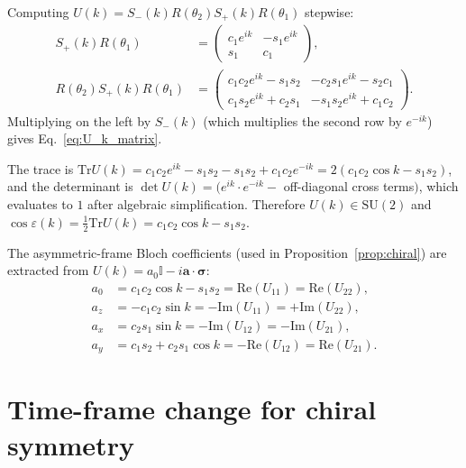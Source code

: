 \documentclass[aps,pra,reprint,amsmath,amssymb,superscriptaddress,nofootinbib,longbibliography]{revtex4-2}
\newcommand{\I}{\mathbb{I}}
\newcommand{\Tr}{\mathrm{Tr}}
\begin{document}
Computing $U(k) = S_-(k) R(\theta_2) S_+(k) R(\theta_1)$ stepwise:
\begin{align}
S_+(k) R(\theta_1) &= \begin{pmatrix} c_1 e^{ik} & -s_1 e^{ik} \\ s_1 & c_1 \end{pmatrix}, \\
R(\theta_2) S_+(k) R(\theta_1) &= \begin{pmatrix} c_1 c_2 e^{ik} - s_1 s_2 & -c_2 s_1 e^{ik} - s_2 c_1 \\ c_1 s_2 e^{ik} + c_2 s_1 & -s_1 s_2 e^{ik} + c_1 c_2 \end{pmatrix}.
\end{align}
Multiplying on the left by $S_-(k)$ (which multiplies the second row by $e^{-ik}$) gives Eq.~\eqref{eq:U_k_matrix}.

The trace is $\Tr U(k) = c_1 c_2 e^{ik} - s_1 s_2 - s_1 s_2 + c_1 c_2 e^{-ik} = 2(c_1 c_2 \cos k - s_1 s_2)$, and the determinant is $\det U(k) = (e^{ik} \cdot e^{-ik} - $ off-diagonal cross terms$)$, which evaluates to $1$ after algebraic simplification. Therefore $U(k) \in \mathrm{SU}(2)$ and $\cos\varepsilon(k) = \frac{1}{2}\Tr U(k) = c_1 c_2 \cos k - s_1 s_2$.

The asymmetric-frame Bloch coefficients (used in Proposition~\ref{prop:chiral}) are extracted from $U(k) = a_0 \I - i \mathbf{a} \cdot \boldsymbol{\sigma}$:
\begin{align}
a_0 &= c_1 c_2 \cos k - s_1 s_2 = \mathrm{Re}(U_{11}) = \mathrm{Re}(U_{22}), \\
a_z &= -c_1 c_2 \sin k = -\mathrm{Im}(U_{11}) = +\mathrm{Im}(U_{22}), \\
a_x &= c_2 s_1 \sin k = -\mathrm{Im}(U_{12}) = -\mathrm{Im}(U_{21}), \\
a_y &= c_1 s_2 + c_2 s_1 \cos k = -\mathrm{Re}(U_{12}) = \mathrm{Re}(U_{21}).
\end{align}

\section{Time-frame change for chiral symmetry}
\label{app:chiral_frame}
\end{document}
